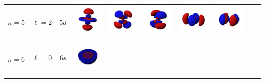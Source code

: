 \begin{landscape}
\begin{xltabular}{\linewidth}{C C C c c c c c c c}
 &  &  & 
\includegraphics[width=1.6cm]{tableau_geometrie_orbitale_modelisation/D5z2.png} 
&
\includegraphics[width=1.6cm]{tableau_geometrie_orbitale_modelisation/D5xz.png}  
&
\includegraphics[width=1.6cm]{tableau_geometrie_orbitale_modelisation/D5yz.png} 
& 
\includegraphics[width=1.6cm]{tableau_geometrie_orbitale_modelisation/D5xy.png} 
&
\includegraphics[width=1.6cm]{tableau_geometrie_orbitale_modelisation/D5x2-y2.png} 
& & \\
& & &  &  &  &  &  & &  \\ %

\midrule

 &  &  & 
\includegraphics[width=1.6cm]{tableau_geometrie_orbitale_modelisation/S6M0.png} 
& & & & & & \\

& & &  & & & & & &  \\ %

\addlinespace


\end{xltabular}
\end{landscape}
